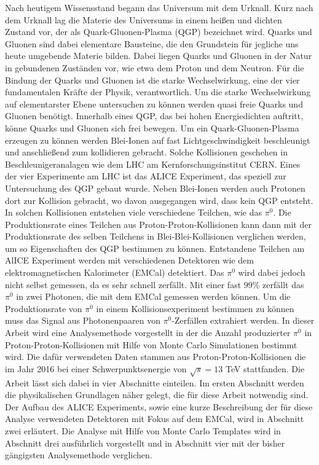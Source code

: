 Nach heutigem Wissensstand begann das Universum mit dem Urknall.
Kurz nach dem Urknall lag die Materie des Universums in einem heißen und dichten Zustand vor, der als Quark-Gluonen-Plasma (QGP) bezeichnet wird.
Quarks und Gluonen sind dabei elementare Bausteine, die den Grundstein für jegliche uns heute umgebende Materie bilden.
Dabei liegen Quarks und Gluonen in der Natur in gebundenen Zuständen vor, wie etwa dem Proton und dem Neutron.
\newline
Für die Bindung der Quarks und Gluonen ist die starke Wechselwirkung, eine der vier fundamentalen Kräfte der Physik, verantwortlich.
Um die starke Wechselwirkung auf elementarster Ebene untersuchen zu können werden quasi freie Quarks und Gluonen benötigt.
Innerhalb eines QGP, das bei hohen Energiedichten auftritt, könne Quarks und Gluonen sich frei bewegen.
\newline
Um ein Quark-Gluonen-Plasma erzeugen zu können werden Blei-Ionen auf fast Lichtgeschwindigkeit beschleunigt und anschließend zum kollidieren gebracht.
Solche Kollisionen geschehen in Beschleunigeranalagen wie dem LHC am Kernforschungsinstitut CERN.
Eines der vier Experimente am LHC ist das ALICE Experiment, das speziell zur Untersuchung des QGP gebaut wurde.
\newline
Neben Blei-Ionen werden auch Protonen dort zur Kollision gebracht, wo davon ausgegangen wird, dass kein QGP entsteht.
In solchen Kollisionen entstehen viele verschiedene Teilchen, wie das $\pi^{0}$.
Die Produktionsrate eines Teilchen aus Proton-Proton-Kollisionen kann dann mit der Produktionsrate des selben Teilchens in Blei-Blei-Kollisionen verglichen werden, um so Eigenschaften des QGP bestimmen zu können.
\newline
Entstandene Teilchen am AlICE Experiment werden mit verschiedenen Detektoren wie dem elektromagnetischen Kalorimeter (EMCal) detektiert.
Das $\pi^{0}$ wird dabei jedoch nicht selbst gemessen, da es sehr schnell zerfällt.
Mit einer fast $99\%$ zerfällt das $\pi^{0}$ in zwei Photonen, die mit dem EMCal gemessen werden können.
Um die Produktionsrate von $\pi^{0}$ in einem Kollisionsexperiment bestimmen zu können muss das Signal aus Photonenpaaren von $\pi^{0}$-Zerfällen extrahiert werden.
\newline
In dieser Arbeit wird eine Analysemethode vorgestellt in der die Anzahl produzierter $\pi^{0}$ in Proton-Proton-Kollisionen mit Hilfe von Monte Carlo Simulationen bestimmt wird.
Die dafür verwendeten Daten stammen aus Proton-Proton-Kollisionen die im Jahr 2016 bei einer Schwerpunktsenergie von $\sqrt{s}=13$ TeV stattfanden.
\newline
Die Arbeit lässt sich dabei in vier Abschnitte einteilen.
Im ersten Abschnitt werden die physikalischen Grundlagen näher gelegt, die für diese Arbeit notwendig sind.
Der Aufbau des ALICE Experiments, sowie eine kurze Beschreibung der für diese Analyse verwendeten Detektoren mit Fokus auf dem EMCal, wird in Abschnitt zwei erläutert.
Die Analyse mit Hilfe von Monte Carlo Templates wird in Abschnitt drei ausführlich vorgestellt und in Abschnitt vier mit der bisher gängigsten Analysemethode verglichen.